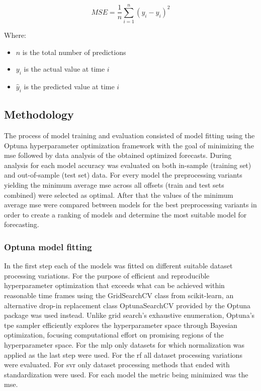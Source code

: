 $$MSE = \frac{1}{n} \sum_{i=1}^{n} (y_i - \hat{y}_i)^2$$

Where:
\begin{itemize}
    \item $n$ is the total number of predictions
    \item $y_i$ is the actual value at time $i$
    \item $\hat{y}_i$ is the predicted value at time $i$
\end{itemize}

\subsection{Methodology}\label{Methodology}

The process of model training and evaluation consisted of model fitting using the Optuna hyperparameter optimization framework with the goal of minimizing the \gls{mse} followed by data analysis of the obtained optimized forecasts. During analysis for each model accuracy was evaluated on both in-sample (training set) and out-of-sample (test set) data. For every model the preprocessing variants yielding the minimum average \gls{mse} across all offsets (train and test sets combined) were selected as optimal. After that the values of the minimum average \gls{mse} were compared between models for the best preprocessing variants in order to create a ranking of models and determine the most suitable model for forecasting.

\subsubsection{Optuna model fitting}\label{Optuna model fitting}

In the first step each of the models was fitted on different suitable dataset processing variations. For the purpose of efficient and reproducible hyperparameter optimization that exceeds what can be achieved within reasonable time frames using the GridSearchCV class from scikit-learn, an alternative drop-in replacement class OptunaSearchCV provided by the Optuna package was used instead. Unlike grid search's exhaustive enumeration, Optuna's \gls{tpe} sampler efficiently explores the hyperparameter space through Bayesian optimization, focusing computational effort on promising regions of the hyperparameter space. For the \gls{mlp} only datasets for which normalization was applied as the last step were used. For the \gls{rf} all dataset processing variations were evaluated. For \gls{svr} only dataset processing methods that ended with standardization were used. For each model the metric being minimized was the \gls{mse}.

